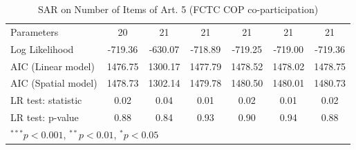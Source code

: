 \begin{table}[!h]
\begin{center}
\begin{tabular}{l c c c c c c }
Parameters              & 20           & 21           & 21           & 21           & 21           & 21           \\
Log Likelihood          & -719.36      & -630.07      & -718.89      & -719.25      & -719.00      & -719.36      \\
AIC (Linear model)      & 1476.75      & 1300.17      & 1477.79      & 1478.52      & 1478.02      & 1478.75      \\
AIC (Spatial model)     & 1478.73      & 1302.14      & 1479.78      & 1480.50      & 1480.01      & 1480.73      \\
LR test: statistic      & 0.02         & 0.04         & 0.01         & 0.02         & 0.01         & 0.02         \\
LR test: p-value        & 0.88         & 0.84         & 0.93         & 0.90         & 0.94         & 0.88         \\
\bottomrule
\multicolumn{7}{l}{\scriptsize{$^{***}p<0.001$, $^{**}p<0.01$, $^*p<0.05$}}
\end{tabular}
\caption{SAR on Number of Items of Art. 5 (FCTC COP co-participation)}
\label{table:coefficients}
\end{center}
\end{table}
